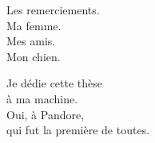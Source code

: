\documentclass[11pt]{thesul}
\begin{document}

\begin{ThesisAcknowledgments}
    Les remerciements.\\
    Ma femme.\\
    Mes amis.\\
    Mon chien.\\
\end{ThesisAcknowledgments}


\begin{ThesisDedication}
    Je dédie cette thèse\\
    à ma machine.\\
    Oui, à Pandore,\\
    qui fut la première de toutes.
\end{ThesisDedication}


\tableofcontents

\listoffigures

\listoftables


\mainmatter




\end{document}
